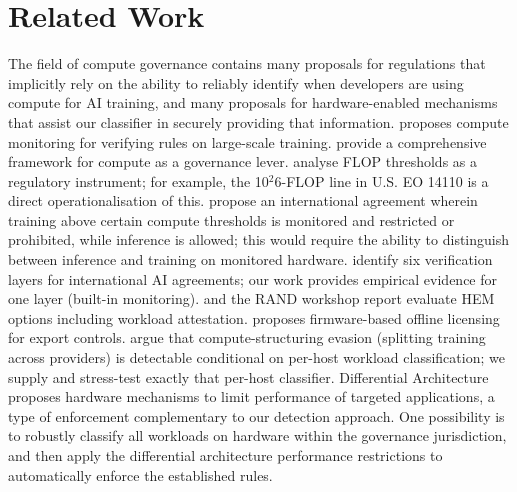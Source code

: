 \section{Related Work}

The field of compute governance contains many proposals for regulations that implicitly rely on the ability to reliably identify when developers are using compute for AI training, and many proposals for hardware-enabled mechanisms that assist our classifier in securely providing that information. \citet{shavit2023} proposes compute monitoring for verifying rules on large-scale training. \citet{sastry2024} provide a comprehensive framework for compute as a governance lever. \citet{heimkoessler2024} analyse FLOP thresholds as a regulatory instrument; for example, the 10$^2$6-FLOP line in U.S. EO 14110 is a direct operationalisation of this. \citet{scher2025} propose an international agreement wherein training above certain compute thresholds is monitored and restricted or prohibited, while inference is allowed; this would require the ability to distinguish between inference and training on monitored hardware. \citet{baker2025} identify six verification layers for international AI agreements; our work provides empirical evidence for one layer (built-in monitoring). \citet{ogara2025} and the RAND workshop report \citep{kulp2025} evaluate HEM options including workload attestation. \citet{petriesolo2025} proposes firmware-based offline licensing for export controls. \citet{seferis2025} argue that compute-structuring evasion (splitting training across providers) is detectable conditional on per-host workload classification; we supply and stress-test exactly that per-host classifier. Differential Architecture \citep{anonymous2026} proposes hardware mechanisms to limit performance of targeted applications, a type of enforcement complementary to our detection approach. One possibility is to robustly classify all workloads on hardware within the governance jurisdiction, and then apply the differential architecture performance restrictions to automatically enforce the established rules.

